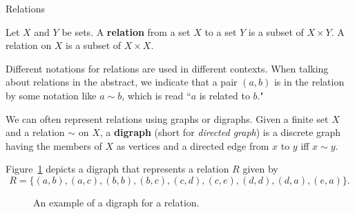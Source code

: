 \begin{section}{Relations}

\begin{definition}
Let $X$ and $Y$ be sets. A \textbf{relation} from a set $X$ to a set $Y$ is a subset of $X \times Y$. A relation on $X$ is a subset of $X \times X$.  
\end{definition}

\begin{remark}
Different notations for relations are used in different contexts.  When talking about relations in the abstract, we indicate that a pair $(a,b)$ is in the relation by some notation like $a\sim b$, which is read ``$a$ is related to $b$."
\end{remark}

\begin{remark}
We can often represent relations using graphs or digraphs.  Given a finite set $X$ and a relation $\sim$ on $X$, a \textbf{digraph} (short for \emph{directed graph}) is a discrete graph having the members of $X$ as vertices and a directed edge from $x$ to $y$ iff $x\sim y$.
\end{remark}

\begin{example}
Figure~\ref{fig:digraph} depicts a digraph that represents a relation $R$ given by
\[
R=\{(a,b),(a,c),(b,b),(b,c),(c,d),(c,e),(d,d),(d,a),(e,a)\}.
\]

\begin{figure}[h]
\begin{center}
\caption{An example of a digraph for a relation.}\label{fig:digraph}
\end{center}
\end{figure}


\end{example}
\end{section}
